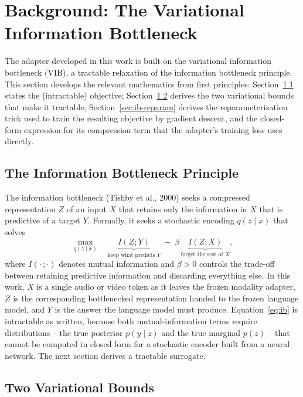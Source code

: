\documentclass[11pt,a4paper,oneside]{article}
\begin{document}
\clearpage
\section{Background: The Variational Information Bottleneck}
\label{sec:background}

The adapter developed in this work is built on the variational information bottleneck (VIB), a
tractable relaxation of the information bottleneck principle. This section develops the relevant
mathematics from first principles: Section~\ref{sec:ib-principle} states the (intractable) objective;
Section~\ref{sec:ib-bounds} derives the two variational bounds that make it tractable;
Section~\ref{sec:ib-reparam} derives the reparameterization trick used to train the resulting
objective by gradient descent, and the closed-form expression for its compression term that the
adapter's training loss uses directly.

\subsection{The Information Bottleneck Principle}
\label{sec:ib-principle}

The information bottleneck (Tishby et al., 2000) seeks a compressed representation $Z$ of an input
$X$ that retains only the information in $X$ that is predictive of a target $Y$. Formally, it seeks a
stochastic encoding $q(z\mid x)$ that solves
\begin{equation}
\max_{q(z\mid x)}\quad \underbrace{I(Z;Y)}_{\text{keep what predicts } Y} \;-\; \beta\, \underbrace{I(Z;X)}_{\text{forget the rest of } X},
\label{eq:ib}
\end{equation}
where $I(\cdot\,;\cdot)$ denotes mutual information and $\beta>0$ controls the trade-off between
retaining predictive information and discarding everything else. In this work, $X$ is a single
audio or video token as it leaves the frozen modality adapter, $Z$ is the corresponding bottlenecked
representation handed to the frozen language model, and $Y$ is the answer the language model must
produce. Equation~\eqref{eq:ib} is intractable as written, because both mutual-information terms
require distributions -- the true posterior $p(y\mid z)$ and the true marginal $p(z)$ -- that cannot
be computed in closed form for a stochastic encoder built from a neural network. The next section
derives a tractable surrogate.

\subsection{Two Variational Bounds}
\label{sec:ib-bounds}
\end{document}
